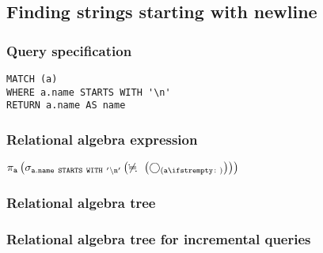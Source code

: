\subsection{Finding strings starting with newline}

\subsubsection*{Query specification}

\begin{lstlisting}
MATCH (a)
WHERE a.name STARTS WITH '\n'
RETURN a.name AS name
\end{lstlisting}

\subsubsection*{Relational algebra expression}

$\projection{\var{a}} \left(\selection{\mathtt{a.name~STARTS~WITH~'\backslash{}n'}} \left(\alldifferent{} \left(\getvertices{a}{}\right)\right)\right)$

\subsubsection*{Relational algebra tree}


\subsubsection*{Relational algebra tree for incremental queries}



